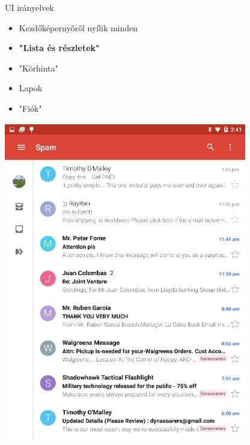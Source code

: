 \documentclass{beamer}
\begin{document}
\begin{frame}[fragile]{UI irányelvek}
	\begin{minipage}{0.49\textwidth}
		\begin{itemize}
			\item Kezdőképernyőről nyílik minden 
			\item \textbf{"Lista és részletek"} 
			\item "Körhinta"
			\item Lapok
			\item "Fiók"
		\end{itemize}
	\end{minipage}
	\begin{minipage}{0.49\textwidth}
		\begin{itemize}
			\includegraphics[width=1\linewidth]{figures/listdetails.jpg}
		\end{itemize}
	\end{minipage}
\end{frame}
\end{document}
